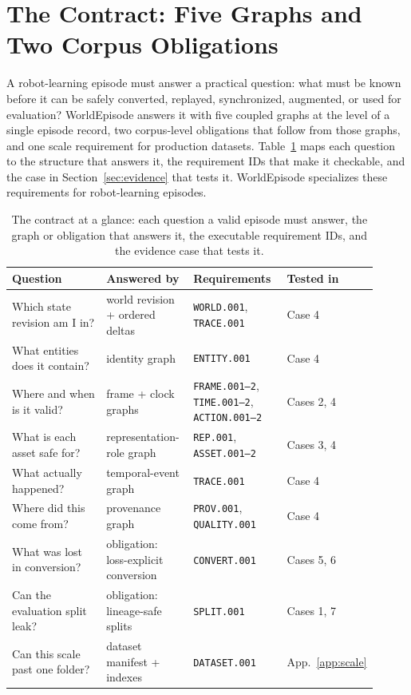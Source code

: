 \section{The Contract: Five Graphs and Two Corpus Obligations}
\label{sec:questions}

A robot-learning episode must answer a practical question: what must be known before it can be
safely converted, replayed, synchronized, augmented, or used for evaluation? WorldEpisode answers
it with five coupled graphs at the level of a single episode record, two corpus-level obligations
that follow from those graphs, and one scale requirement for production datasets.
Table~\ref{tab:contract-map} maps each question to the structure that answers it, the requirement
IDs that make it checkable, and the case in Section~\ref{sec:evidence} that tests it.
WorldEpisode specializes these requirements for robot-learning episodes.

\begin{table}[t]
\centering
\footnotesize
\caption{The contract at a glance: each question a valid episode must answer, the graph or
obligation that answers it, the executable requirement IDs, and the evidence case that tests it.}
\label{tab:contract-map}
\begin{tabular}{@{}>{\raggedright\arraybackslash}p{0.29\linewidth}
                >{\raggedright\arraybackslash}p{0.24\linewidth}
                >{\raggedright\arraybackslash}p{0.26\linewidth}
                >{\raggedright\arraybackslash}p{0.12\linewidth}@{}}
\toprule
Question & Answered by & Requirements & Tested in \\
\midrule
Which state revision am I in? & world revision + ordered deltas & \texttt{WORLD.001}, \texttt{TRACE.001} & Case 4 \\
What entities does it contain? & identity graph & \texttt{ENTITY.001} & Case 4 \\
Where and when is it valid? & frame + clock graphs & \texttt{FRAME.001--2}, \texttt{TIME.001--2}, \texttt{ACTION.001--2} & Cases 2, 4 \\
What is each asset safe for? & representation-role graph & \texttt{REP.001}, \texttt{ASSET.001--2} & Cases 3, 4 \\
What actually happened? & temporal-event graph & \texttt{TRACE.001} & Case 4 \\
Where did this come from? & provenance graph & \texttt{PROV.001}, \texttt{QUALITY.001} & Case 4 \\
What was lost in conversion? & obligation: loss-explicit conversion & \texttt{CONVERT.001} & Cases 5, 6 \\
Can the evaluation split leak? & obligation: lineage-safe splits & \texttt{SPLIT.001} & Cases 1, 7 \\
Can this scale past one folder? & dataset manifest + indexes & \texttt{DATASET.001} & App.~\ref{app:scale} \\
\bottomrule
\end{tabular}
\end{table}

